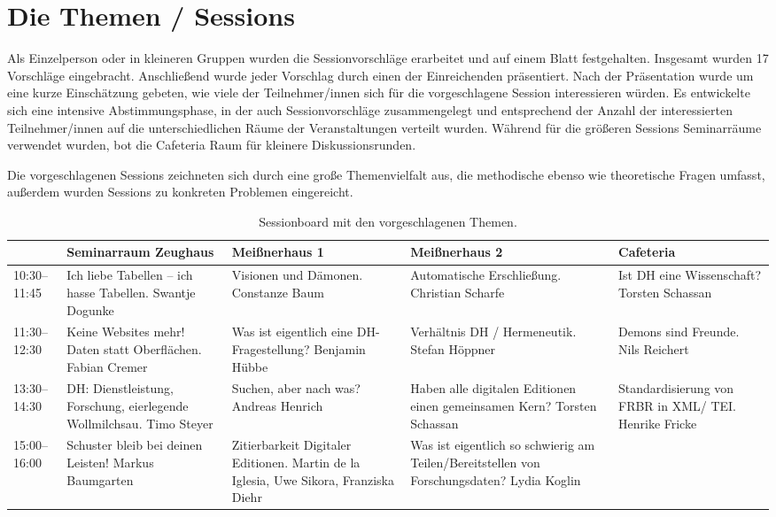 \documentclass[a4paper,
fontsize=11pt,
oneside,
numbers=noperiodatend,
parskip=half-,
bibliography=totoc,
final
]{scrartcl}
\begin{document}
\section{Die Themen / Sessions}\label{die-themen-sessions}

Als Einzelperson oder in kleineren Gruppen wurden die Sessionvorschläge
erarbeitet und auf einem Blatt festgehalten. Insgesamt wurden 17
Vorschläge eingebracht. Anschließend wurde jeder Vorschlag durch einen
der Einreichenden präsentiert. Nach der Präsentation wurde um eine kurze
Einschätzung gebeten, wie viele der Teilnehmer/innen sich für die
vorgeschlagene Session interessieren würden. Es entwickelte sich eine
intensive Abstimmungsphase, in der auch Sessionvorschläge zusammengelegt
und entsprechend der Anzahl der interessierten Teilnehmer/innen auf die
unterschiedlichen Räume der Veranstaltungen verteilt wurden. Während für
die größeren Sessions Seminarräume verwendet wurden, bot die Cafeteria
Raum für kleinere Diskussionsrunden.

Die vorgeschlagenen Sessions zeichneten sich durch eine große
Themenvielfalt aus, die methodische ebenso wie theoretische Fragen
umfasst, außerdem wurden Sessions zu konkreten Problemen eingereicht.

\begin{table}[h]
\centering
\footnotesize
\begin{tabular}{p{1.5cm}p{3cm}p{3cm}p{3cm}p{3cm}}
\toprule
 & \textbf{Seminarraum Zeughaus} & \textbf{Meißnerhaus 1} & \textbf{Meißnerhaus 2} & \textbf{Cafeteria} \\
 \midrule
10:30–11:45 & Ich liebe Tabellen – ich hasse Tabellen. Swantje Dogunke & Visionen und Dämonen. Constanze Baum & Automatische Erschließung. Christian Scharfe & Ist DH eine Wissenschaft? Torsten Schassan \\
\midrule
11:30–12:30 & Keine Websites mehr! Daten statt Oberflächen. Fabian Cremer & Was ist eigentlich eine DH-Fragestellung? Benjamin Hübbe & Verhältnis DH / Hermeneutik. Stefan Höppner & Demons sind Freunde. Nils Reichert \\
\midrule
13:30–14:30 & DH: Dienstleistung, Forschung, eierlegende Wollmilchsau. Timo Steyer & Suchen, aber nach was? Andreas Henrich & Haben alle digitalen Editionen einen gemeinsamen Kern? Torsten Schassan & Standardisierung von FRBR in XML/ TEI. Henrike Fricke \\
\midrule
15:00–16:00 & Schuster bleib bei deinen Leisten! Markus Baumgarten & Zitierbarkeit Digitaler Editionen. Martin de la Iglesia, Uwe Sikora, Franziska Diehr & Was ist eigentlich so schwierig am Teilen/Bereitstellen von Forschungsdaten? Lydia Koglin & ~ \\
\bottomrule
\end{tabular}
\caption{Sessionboard mit den vorgeschlagenen Themen.}
\label{tab:1}
\end{table}
\end{document}
